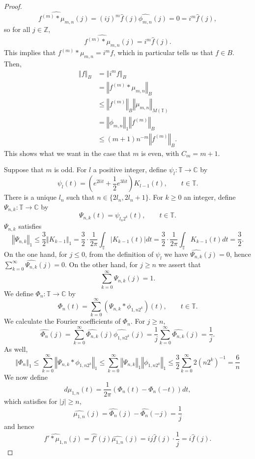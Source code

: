 \documentclass{article}
\newcommand{\norm}[1]{\left\Vert #1 \right\Vert}
\theoremstyle{definition}
\theoremstyle{definition}
\begin{document}
\begin{proof}
\[
\widehat{f^{(m)}*\mu_{m,n}}(j)=(ij)^m \hat{f}(j) \widehat{\phi_{m,n}}(j)=0=i^m \hat{f}(j),
\]
so for all $j \in \mathbb{Z}$,
\[
\widehat{f^{(m)}*\mu_{m,n}}(j)=i^m \hat{f}(j).
\]
This implies that $f^{(m)}*\mu_{m,n}=i^m f$, which in particular tells us that $f \in B$.
Then,
\begin{align*}
\norm{f}_B &= \norm{i^m f}_B\\
&=\norm{f^{(m)}*\mu_{m,n}}_B\\
&\leq \norm{f^{(m)}}_B \norm{\mu_{m,n}}_{M(\mathbb{T})}\\
&=\norm{\phi_{m,n}}_1 \norm{f^{(m)}}_B\\
&\leq (m+1)n^{-m}  \norm{f^{(m)}}_B.
\end{align*}
This shows what we want in the case that $m$ is even, with $C_m=m+1$.

Suppose that $m$ is odd. For $l$ a positive integer, define $\psi_l:\mathbb{T} \to \mathbb{C}$ by
\[
\psi_l(t) = \left(e^{2lit}+\frac{1}{2}e^{3lit} \right) K_{l-1}(t), \qquad  t \in \mathbb{T}.
\]
There is a unique  $l_n$ such that $n \in \{2l_n,2l_n+1\}$. For $k \geq 0$ an integer, define
$\Psi_{n,k}:\mathbb{T} \to \mathbb{C}$ by
\[
\Psi_{n,k}(t) = \psi_{l_n 2^k}(t), \qquad t \in \mathbb{T}.
\]
$\Psi_{n,k}$ satisfies
\[
\norm{\Psi_{n,k}}_1 \leq \frac{3}{2} \norm{K_{k-1}}_1 
=\frac{3}{2} \cdot \frac{1}{2\pi} \int_{\mathbb{T}} |K_{k-1}(t)| dt
=\frac{3}{2} \cdot \frac{1}{2\pi}  \int_{\mathbb{T}} K_{k-1}(t) dt=\frac{3}{2}.
\]
On the one hand,
for $j \leq 0$,
from the definition of $\psi_l$ we have $\widehat{\Psi_{n,k}}(j)=0$, hence
$\sum_{k=0}^\infty \widehat{\Psi_{n,k}}(j)=0$.
On the other hand, for $j \geq n$ we assert that
\[
\sum_{k=0}^\infty \widehat{\Psi_{n,k}}(j)=1.
\]
We define $\Phi_n: \mathbb{T} \to \mathbb{C}$ by
\[
\Phi_n(t) =\sum_{k=0}^\infty (\Psi_{n,k}*\phi_{1,n2^k})(t), \qquad t \in \mathbb{T}.
\]
We calculate the Fourier coefficients of $\Phi_n$. For $j \geq n$, 
\[
\widehat{\Phi_n}(j) = \sum_{k=0}^\infty \widehat{\Phi_{n,k}}(j) \widehat{\phi_{1,n2^k}}(j)
=\frac{1}{j} \sum_{k=0}^\infty   \widehat{\Phi_{n,k}}(j) 
=\frac{1}{j}.
\]
As well,
\[
\norm{\Phi_n}_1 \leq \sum_{k=0}^\infty \norm{\Psi_{n,k}*\phi_{1,n2^k}}_1
\leq \sum_{k=0}^\infty \norm{\Psi_{n,k}}_1 \norm{\phi_{1,n2^k}}_1
\leq \frac{3}{2}  \sum_{k=0}^\infty 2 (n2^k)^{-1}
=\frac{6}{n}
\]
We now define
\[
d\mu_{1,n}(t) = \frac{1}{2\pi} (\Phi_n(t)-\Phi_n(-t)) dt,
\]
which satisfies for $|j| \geq n$,
\[
\widehat{\mu_{1,n}}(j)=\widehat{\Phi_n}(j)-\widehat{\Phi_n}(-j)=\frac{1}{j}
\]
and hence
\[
\widehat{f'*\mu_{1,n}}(j)=\widehat{f'}(j) \widehat{\mu_{1,n}}(j)=ij \hat{f}(j) \cdot \frac{1}{j}=i \hat{f}(j).
\]
\end{proof}
\end{document}
